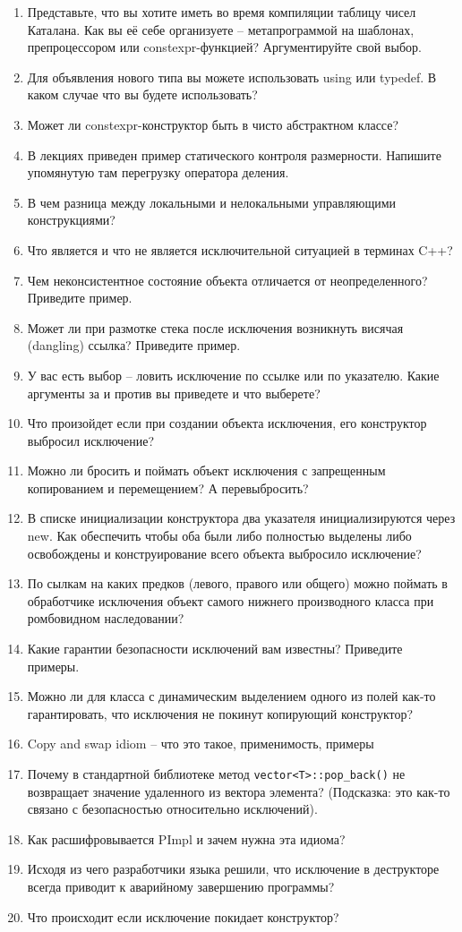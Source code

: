 \documentclass[a4paper,12pt,oneside]{article}
\begin{document}
\begin{enumerate}
\item Представьте, что вы хотите иметь во время компиляции таблицу чисел Каталана. Как вы её себе организуете -- метапрограммой на шаблонах, препроцессором или constexpr-функцией? Аргументируйте свой выбор.
\item Для объявления нового типа вы можете использовать using или typedef. В каком случае что вы будете использовать?
\item Может ли constexpr-конструктор быть в чисто абстрактном классе?
\item В лекциях приведен пример статического контроля размерности. Напишите упомянутую там перегрузку оператора деления.

\item В чем разница между локальными и нелокальными управляющими конструкциями?
\item Что является и что не является исключительной ситуацией в терминах C++?
\item Чем неконсистентное состояние объекта отличается от неопределенного? Приведите пример.
\item Может ли при размотке стека после исключения возникнуть висячая (dangling) ссылка? Приведите пример.
\item У вас есть выбор -- ловить исключение по ссылке или по указателю. Какие аргументы за и против вы приведете и что выберете?
\item Что произойдет если при создании объекта исключения, его конструктор выбросил исключение?
\item Можно ли бросить и поймать объект исключения с запрещенным копированием и перемещением? А перевыбросить?
\item В списке инициализации конструктора два указателя инициализируются через new. Как обеспечить чтобы оба были либо полностью выделены либо освобождены и конструирование всего объекта выбросило исключение?
\item По сылкам на каких предков (левого, правого или общего) можно поймать в обработчике исключения объект самого нижнего производного класса при ромбовидном наследовании?
\item Какие гарантии безопасности исключений вам известны? Приведите примеры.
\item Можно ли для класса с динамическим выделением одного из полей как-то гарантировать, что исключения не покинут копирующий конструктор?
\item Copy and swap idiom -- что это такое, применимость, примеры
\item Почему в стандартной библиотеке метод \lstinline!vector<T>::pop_back()! не возвращает значение удаленного из вектора элемента? (Подсказка: это как-то связано с безопасностью относительно исключений).
\item Как расшифровывается PImpl и зачем нужна эта идиома?
\item Исходя из чего разработчики языка решили, что исключение в деструкторе всегда приводит к аварийному завершению программы?
\item Что происходит если исключение покидает конструктор?
\end{enumerate}
\end{document}
